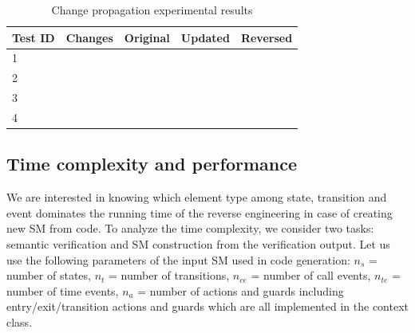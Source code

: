 \begin{table}
\centering
\caption{Change propagation experimental results}
\label{table:change-propa}
\begin{tabular}{|l|l|l|l|l|}
\hline
Test ID & Changes & Original & Updated & Reversed \\ \hline
1       &         &          &         &          \\ \hline
2       &         &          &         &          \\ \hline
3       &         &          &         &          \\ \hline
4       &         &          &         &          \\ \hline
\end{tabular}
\end{table}

\subsection{Time complexity and performance}
We are interested in knowing which element type among state, transition and event dominates the running time of the reverse engineering in case of creating new SM from code. To analyze the time complexity, we consider two tasks: semantic verification and SM construction from the verification output. Let us use the following parameters of the input SM used in code generation: $n_{s}$ = number of states, $n_{t}$ = number of transitions, $n_{ce}$ = number of call events, $n_{te}$ = number of time events, $n_{a}$ = number of actions and guards including entry/exit/transition actions and guards which are all implemented in the context class. 

